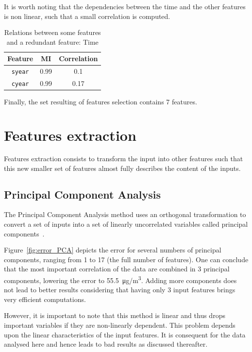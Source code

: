 \documentclass[journal,11pt]{IEEEtran}
\begin{document}
It is worth noting that the dependencies between the time and the other features is non linear, such that a small correlation is computed.

\begin{table}[H]
\setlength{}
\centering
\begin{tabular}{ccc}
\hline
Feature &  MI & Correlation \\ \hline
  \texttt{syear}  & 0.99  & 0.1  \\
 \texttt{cyear}  & 0.99  &  0.17 \\ \hline
\end{tabular}
\vspace*{3mm}
\caption{Relations between some features and a redundant feature: Time}
\label{tab:time}
\end{table}

Finally, the set resulting of features selection contains 7 features.

\section{Features extraction}
\label{Features_extraction}


Features extraction consists to transform the input into other features such that this new smaller set of features almost fully describes the content of the inputs.

\subsection{Principal Component Analysis}

The Principal Component Analysis method uses an orthogonal transformation to convert a set of inputs into a set of linearly uncorrelated variables called principal components~\cite{pca}.

Figure~\ref{fig:error_PCA} depicts the error for several numbers of principal components, ranging from 1 to 17 (the full number of features). One can conclude that the most important correlation of the data are combined in 3 principal components, lowering the error to \SI{55.5}{\micro g/m^3}. Adding more components does not lead to better results considering that having only 3 input features brings very efficient computations.

However, it is important to note that this method is linear and thus drops important variables if they are non-linearly dependent. This problem depends upon the linear characteristics of the input features. It is consequent for the data analysed here and hence leads to bad results as discussed thereafter.
\end{document}
